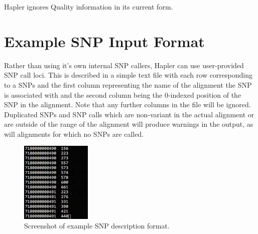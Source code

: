 \documentclass[11pt]{llncs}
\begin{document}
Hapler ignores Quality information in its current form.


\section{Example SNP Input Format}
\label{exampleSnpInputFormat}

Rather than using it's own internal SNP callers, Hapler can use user-provided SNP call loci. This is described in a simple text file with each row 
corresponding to a SNPs and the first column representing the name of the alignment the SNP is associated with and the second column being the 
0-indexed position of the SNP in the alignment. Note that any further columns in the file will be ignored. Duplicated SNPs and SNP calls which are 
non-variant in the actual alignment or are outside of the range of the alignment will produce warnings in the output, as will alignments for which no 
SNPs are called.

\begin{figure}[!h]
\centering
   \includegraphics[width=0.3\textwidth]{graphics/Example_snp}
   \caption{Screenshot of example SNP description format.}
   \label{exampleSAM}
\end{figure}




\end{document}
